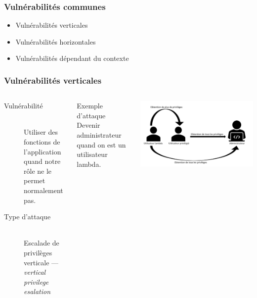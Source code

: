 \documentclass[aspectratio=169]{beamer}  %
\begin{document}
\begin{frame}
  \frametitle{Vulnérabilités communes}
  \begin{itemize}
    \item Vulnérabilités verticales
    \item Vulnérabilités horizontales
    \item Vulnérabilités dépendant du contexte
  \end{itemize}
\end{frame}
\begin{frame}
  \frametitle{Vulnérabilités verticales}
  \begin{columns}[c]
      \begin{description}
        \item[Vulnérabilité] \hfill \\ Utiliser des fonctions de l'application quand notre rôle ne le permet normalement pas.
        \item[Type d'attaque] \hfill \\ Escalade de privilèges verticale --- \emph{vertical privilege esalation}
      \end{description}
      \begin{block}{Exemple d'attaque}
        Devenir administrateur quand on est un utilisateur lambda.
      \end{block}
      \begin{center}
        \includegraphics[width=\textwidth]{escalade-vert}
      \end{center}
  \end{columns}
\end{frame}
\end{document}
